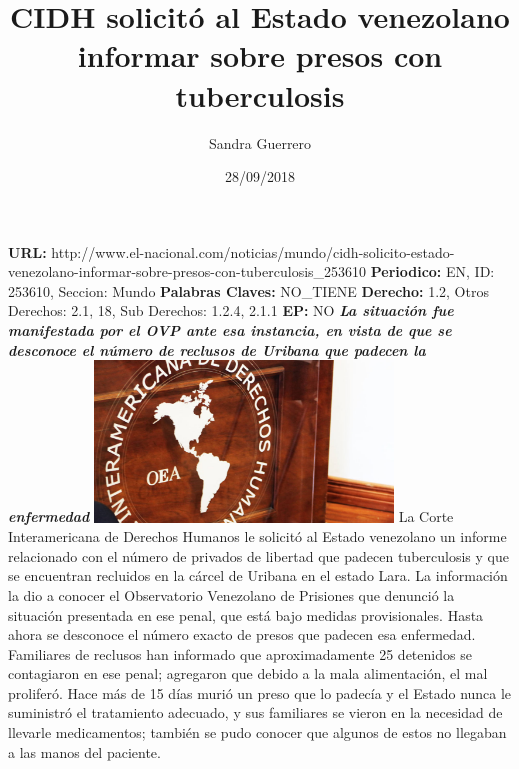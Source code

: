 \documentclass{article}%
\title{\textbf{CIDH solicitó al Estado venezolano informar sobre presos con tuberculosis}}%
\author{Sandra Guerrero}%
\date{28/09/2018}%
\begin{document}
%
\normalsize%
\maketitle%
\textbf{URL: }%
http://www.el{-}nacional.com/noticias/mundo/cidh{-}solicito{-}estado{-}venezolano{-}informar{-}sobre{-}presos{-}con{-}tuberculosis\_253610\newline%
%
\textbf{Periodico: }%
EN, %
ID: %
253610, %
Seccion: %
Mundo\newline%
%
\textbf{Palabras Claves: }%
NO\_TIENE\newline%
%
\textbf{Derecho: }%
1.2, %
Otros Derechos: %
2.1, 18, %
Sub Derechos: %
1.2.4, 2.1.1\newline%
%
\textbf{EP: }%
NO\newline%
\newline%
%
\textbf{\textit{La situación fue manifestada por el OVP ante esa instancia, en vista de que se desconoce el número de reclusos de Uribana que padecen la enfermedad}}%
\newline%
\newline%
%
\includegraphics[width=300px]{169.jpg}%
\newline%
%
La Corte Interamericana de Derechos Humanos le solicitó al Estado venezolano un informe relacionado con el número de privados de libertad que padecen tuberculosis y que se encuentran recluidos en la cárcel de Uribana en el estado Lara.%
\newline%
%
La información la dio a conocer el Observatorio Venezolano de Prisiones que denunció la situación presentada en ese penal, que está bajo medidas provisionales.%
\newline%
%
Hasta ahora se desconoce el número exacto de presos que padecen esa enfermedad. Familiares de reclusos han informado que aproximadamente 25 detenidos se contagiaron en ese penal; agregaron que debido a la mala alimentación, el mal proliferó.%
\newline%
%
Hace más de 15 días murió un preso que lo padecía y el Estado nunca le suministró el tratamiento adecuado, y sus familiares se vieron en la necesidad de llevarle medicamentos; también se pudo conocer que algunos de estos no llegaban a las manos del paciente.%
\end{document}

